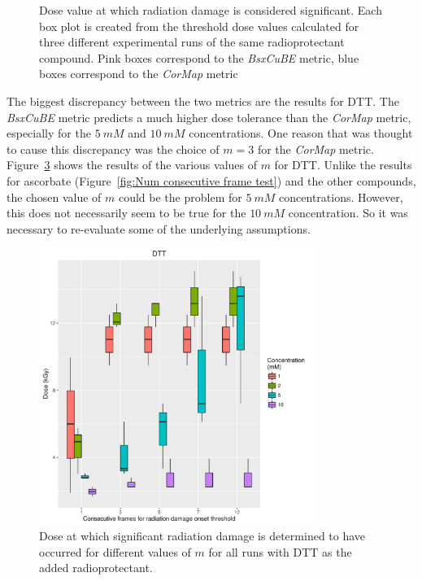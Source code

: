 \begin{figure}
\begin{subfigure}[b]{0.45\textwidth}
            \caption{}
            \label{fig:SAXS Metric comparison - 10mM}
    \end{subfigure}
    \caption{Dose value at which radiation damage is considered significant. Each box plot is created from the threshold dose values calculated for three different experimental runs of the same radioprotectant compound. Pink boxes correspond to the \textit{BsxCuBE} metric, blue boxes correspond to the \textit{CorMap} metric}
    \label{fig:SAXS Metric comparison}
\end{figure}

The biggest discrepancy between the two metrics are the results for DTT.
The \textit{BsxCuBE} metric predicts a much higher dose tolerance than the \textit{CorMap} metric, especially for the $5\ mM$ and $10\ mM$ concentrations.
One reason that was thought to cause this discrepancy was the choice of $m = 3$ for the \textit{CorMap} metric.
Figure~\ref{fig:Num consec frames - DTT} shows the results of the various values of $m$ for DTT.
Unlike the results for ascorbate (Figure~\ref{fig:Num consecutive frame test}) and the other compounds, the chosen value of $m$ could be the problem for $5\ mM$ concentrations.
However, this does not necessarily seem to be true for the $10\ mM$ concentration.
So it was necessary to re-evaluate some of the underlying assumptions.
\begin{figure}
    \centering
    \includegraphics[width=0.8\textwidth]{figures/saxs/DTT_Num_consec_fr_comp.pdf}
    \caption{Dose at which significant radiation damage is determined to have occurred for different values of $m$ for all runs with DTT as the added radioprotectant.}
    \label{fig:Num consec frames - DTT}
\end{figure}

